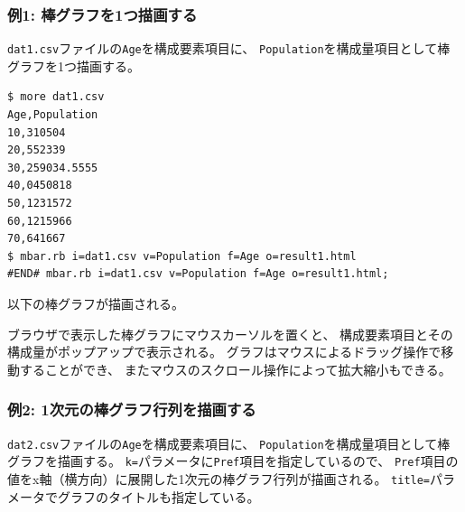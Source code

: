 \subsubsection*{例1: 棒グラフを1つ描画する}

\verb|dat1.csv|ファイルの\verb|Age|を構成要素項目に、
\verb|Population|を構成量項目として棒グラフを1つ描画する。

\begin{Verbatim}[baselinestretch=0.7,frame=single]
$ more dat1.csv
Age,Population
10,310504
20,552339
30,259034.5555
40,0450818
50,1231572
60,1215966
70,641667
$ mbar.rb i=dat1.csv v=Population f=Age o=result1.html
#END# mbar.rb i=dat1.csv v=Population f=Age o=result1.html;
\end{Verbatim}

以下の棒グラフが描画される。

ブラウザで表示した棒グラフにマウスカーソルを置くと、
構成要素項目とその構成量がポップアップで表示される。
グラフはマウスによるドラッグ操作で移動することができ、
またマウスのスクロール操作によって拡大縮小もできる。

\begin{flushleft}
\end{flushleft}

\subsubsection*{例2: 1次元の棒グラフ行列を描画する}

\verb|dat2.csv|ファイルの\verb|Age|を構成要素項目に、
\verb|Population|を構成量項目として棒グラフを描画する。
\verb|k=|パラメータに\verb|Pref|項目を指定しているので、
\verb|Pref|項目の値をx軸（横方向）に展開した1次元の棒グラフ行列が描画される。
\verb|title=|パラメータでグラフのタイトルも指定している。

